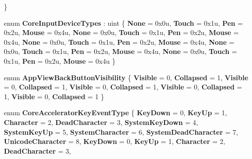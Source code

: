 \begin{DoxyCompactItemize}
 \}
\item 
\mbox{\label{namespace_windows_1_1_u_i_1_1_core_a77ab8ebe40609e15ad86f2c13a357af6}} 
enum {\bfseries Core\+Input\+Device\+Types} \+: uint \{ \newline
{\bfseries None} = 0x0u, 
{\bfseries Touch} = 0x1u, 
{\bfseries Pen} = 0x2u, 
{\bfseries Mouse} = 0x4u, 
\newline
{\bfseries None} = 0x0u, 
{\bfseries Touch} = 0x1u, 
{\bfseries Pen} = 0x2u, 
{\bfseries Mouse} = 0x4u, 
\newline
{\bfseries None} = 0x0u, 
{\bfseries Touch} = 0x1u, 
{\bfseries Pen} = 0x2u, 
{\bfseries Mouse} = 0x4u, 
\newline
{\bfseries None} = 0x0u, 
{\bfseries Touch} = 0x1u, 
{\bfseries Pen} = 0x2u, 
{\bfseries Mouse} = 0x4u, 
\newline
{\bfseries None} = 0x0u, 
{\bfseries Touch} = 0x1u, 
{\bfseries Pen} = 0x2u, 
{\bfseries Mouse} = 0x4u
 \}
\item 
\mbox{\label{namespace_windows_1_1_u_i_1_1_core_a8126ec99b9eece4bc7dfad594e5fa9a6}} 
enum {\bfseries App\+View\+Back\+Button\+Visibility} \{ \newline
{\bfseries Visible} = 0, 
{\bfseries Collapsed} = 1, 
{\bfseries Visible} = 0, 
{\bfseries Collapsed} = 1, 
\newline
{\bfseries Visible} = 0, 
{\bfseries Collapsed} = 1, 
{\bfseries Visible} = 0, 
{\bfseries Collapsed} = 1, 
\newline
{\bfseries Visible} = 0, 
{\bfseries Collapsed} = 1
 \}
\item 
\mbox{\label{namespace_windows_1_1_u_i_1_1_core_a3b4a4c6a338426f7356d6fbe21e0541e}} 
enum {\bfseries Core\+Accelerator\+Key\+Event\+Type} \{ \newline
{\bfseries Key\+Down} = 0, 
{\bfseries Key\+Up} = 1, 
{\bfseries Character} = 2, 
{\bfseries Dead\+Character} = 3, 
\newline
{\bfseries System\+Key\+Down} = 4, 
{\bfseries System\+Key\+Up} = 5, 
{\bfseries System\+Character} = 6, 
{\bfseries System\+Dead\+Character} = 7, 
\newline
{\bfseries Unicode\+Character} = 8, 
{\bfseries Key\+Down} = 0, 
{\bfseries Key\+Up} = 1, 
{\bfseries Character} = 2, 
\newline
{\bfseries Dead\+Character} = 3, 

\end{DoxyCompactItemize}
